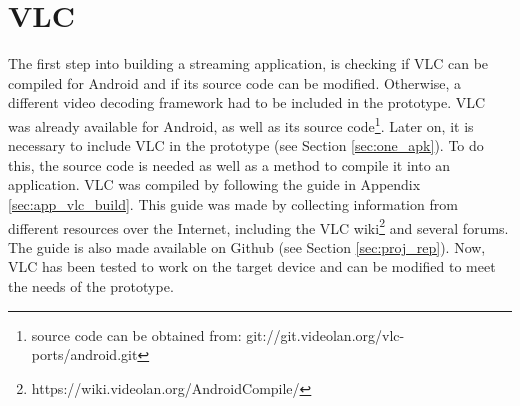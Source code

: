 \section{VLC}
\thispagestyle{fancy}
The first step into building a streaming application, is checking if VLC can be compiled for Android and if its source code can be modified. Otherwise, a different video decoding framework had to be included in the prototype. VLC was already available for Android, as well as its source code\footnote{source code can be obtained from: git://git.videolan.org/vlc-ports/android.git}. Later on, it is necessary to include VLC in the prototype (see Section \ref{sec:one_apk}). To do this, the source code is needed as well as a method to compile it into an application. VLC was compiled by following the guide in Appendix \ref{sec:app_vlc_build}. This guide was made by collecting information from different resources over the Internet, including the VLC wiki\footnote{https://wiki.videolan.org/AndroidCompile/} and several forums. The guide is also made available on Github (see Section \ref{sec:proj_rep}). Now, VLC has been tested to work on the target device and can be modified to meet the needs of the prototype.